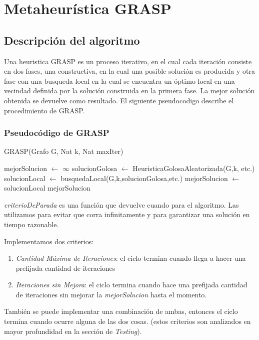 \section{Metaheurística GRASP}
\subsection{Descripción del algoritmo}
Una heuristica GRASP es un proceso iterativo, en el cual cada iteración consiste en dos fases, una constructiva, en la cual una posible solución es producida y otra fase con una busqueda local en la cual se encuentra un óptimo local en una vecindad definida por la solución construida en la primera fase.
La mejor solución obtenida se devuelve como resultado.
El siguiente pseudocodigo describe el procedimiento de GRASP.

\subsubsection{Pseudocódigo de GRASP}
\begin{algorithm}[H]
\begin{algorithmic}[1]
\caption{GRASP(Grafo G, Nat k, Nat maxIter)}
\STATE mejorSolucion $\leftarrow$ $\infty$
    \STATE solucionGolosa $\leftarrow$ HeuristicaGolosaAleatorizada(G,k, etc.)
    \STATE solucionLocal $\leftarrow$ busquedaLocal(G,k,solucionGolosa,etc.)
        \STATE mejorSolucion $\leftarrow$ solucionLocal 
    \ENDIF
\ENDWHILE
\RETURN mejorSolucion
\end{algorithmic}
\end{algorithm}

\textit{criterioDeParada} es una función que devuelve cuando para el algoritmo. Las utilizamos para evitar que corra infinitamente y para garantizar una solución en tiempo razonable. 

Implementamos dos criterios:
\begin{enumerate}
    \item \textit{Cantidad Máxima de Iteraciones}: el ciclo termina cuando llega a hacer una prefijada cantidad de iteraciones 
    \item \textit{Iteraciones sin Mejora}: el ciclo termina cuando hace una prefijada cantidad de iteraciones sin mejorar la \textit{mejorSolucion} hasta el momento.
\end{enumerate} 
También se puede implementar una combinación de ambas, entonces el ciclo termina cuando ocurre alguna de las dos cosas. (estos criterios son analizados en mayor profundidad en la sección de \textit{Testing}).

